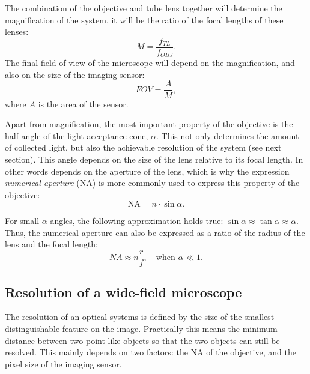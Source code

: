     The combination of the objective and tube lens together will determine the magnification of the system, it will be the ratio of the focal lengths of these lenses:
    \begin{equation}
      M = \frac{f_{TL}}{f_{OBJ}}.
      \label{eq:magnification}
    \end{equation}
    The final field of view of the microscope will depend on the magnification, and also on the size of the imaging sensor:
    \begin{equation}
      FOV = \frac{A}{M},
      \label{eq:FOV}
    \end{equation}
    where $A$ is the area of the sensor. 

    Apart from magnification, the most important property of the objective is the half-angle of the light acceptance cone, $\alpha$. This not only determines the amount of collected light, but also the achievable resolution of the system (see next section). This angle depends on the size of the lens relative to its focal length. In other words depends on the aperture of the lens, which is why the expression \textit{numerical aperture} (NA) is more commonly used to express this property of the objective:
    \begin{equation}
      \text{NA} = n\cdot \sin \alpha.
      \label{eq:NA}
    \end{equation}

    For small $\alpha$ angles, the following approximation holds true: $\sin \alpha \approx \tan \alpha \approx \alpha$. Thus, the numerical aperture can also be expressed as a ratio of the radius of the lens and the focal length:
    \begin{equation}
      NA \approx n \frac{r}{f},\quad \text{when }\alpha \ll 1.
    \end{equation}



  \subsection{Resolution of a wide-field microscope}
    The resolution of an optical systems is defined by the size of the smallest distinguishable feature on the image. Practically this means the minimum distance between two point-like objects so that the two objects can still be resolved. This mainly depends on two factors: the NA of the objective, and the pixel size of the imaging sensor.

